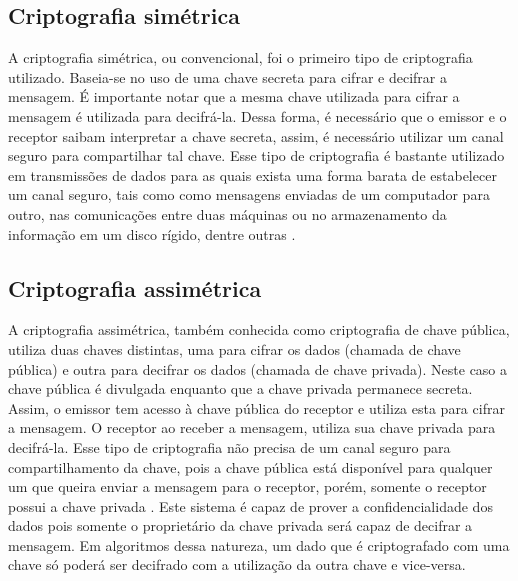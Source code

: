 \subsection{Criptografia simétrica}
A criptografia simétrica, ou convencional, foi o primeiro tipo de criptografia utilizado. Baseia-se no uso de uma chave secreta para cifrar e decifrar a mensagem. É importante notar que a mesma chave utilizada para cifrar a mensagem é utilizada para decifrá-la. Dessa forma, é necessário que o emissor e o receptor saibam interpretar a chave secreta, assim, é necessário utilizar um canal seguro para compartilhar tal chave. Esse tipo de criptografia é bastante utilizado em transmissões de dados para as quais exista uma forma barata de estabelecer um canal seguro, tais como como mensagens enviadas de um computador para outro, nas comunicações entre duas máquinas ou no armazenamento da informação em um disco rígido, dentre outras \cite{Cavalcante:2015}.

%
%
\subsection{Criptografia assimétrica}
A criptografia assimétrica, também conhecida como criptografia de chave pública, utiliza duas chaves distintas, uma para cifrar os dados (chamada de chave pública) e outra para decifrar os dados (chamada de chave privada). Neste caso a chave pública é divulgada enquanto que a chave privada permanece secreta. Assim, o emissor tem acesso à chave pública do receptor e utiliza esta para cifrar a mensagem. O receptor ao receber a mensagem, utiliza sua chave privada para decifrá-la. Esse tipo de criptografia não precisa de um canal seguro para compartilhamento da chave, pois a chave pública está disponível para qualquer um que queira enviar a mensagem para o receptor, porém, somente o receptor possui a chave privada \cite{Cavalcante:2015}.
Este sistema é capaz de prover a confidencialidade dos dados pois somente o proprietário da chave privada será capaz de decifrar a mensagem. Em algoritmos dessa natureza, um dado que é criptografado com uma chave só poderá ser decifrado com a utilização da outra chave e vice-versa.
